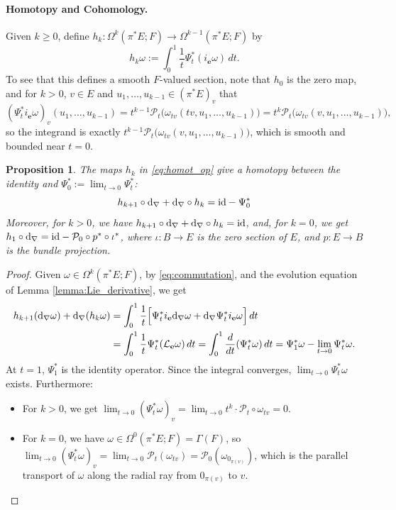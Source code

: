 \documentclass[12pt,letterpaper]{article}
\let\oldd\d
\renewcommand{\d}{%
  \relax\ifmmode\mathrm{d}\else\oldd\fi
}
\newcommand{\e}{\mathbf{e}}
\newcommand{\Lie}{\mathcal{L}}
\newtheorem{proposition}[theorem]{Proposition}
\numberwithin{equation}{section}
\begin{document}
\paragraph{Homotopy and Cohomology.}

Given $k\geq0$, define $h_k:\Omega^k(\pi^*E; F) \to \Omega^{k-1}(\pi^*E; F)$ by 
\begin{equation}\label{eq:homot_op}
h_k \omega := \int_0^1 \frac{1}{t} \Psi_t^* (i_\e \omega) \, dt. 
\end{equation}
To see that this defines a smooth $F$-valued section, note that $h_0$ is the zero map, 
and for $k > 0$, $v \in E$ and $u_1, \dots, u_{k-1} \in (\pi^*E)_v$ that
\[ 
(\Psi_t^* i_\e \omega)_v(u_1, \dots, u_{k-1}) = t^{k-1} \mathcal{P}_t \Big( \omega_{tv}(tv, u_1, \dots, u_{k-1}) \Big) = 
t^k \mathcal{P}_t \Big( \omega_{tv}(v, u_1, \dots, u_{k-1}) \Big),
\]
so the integrand is exactly $t^{k-1} \mathcal{P}_t \Big( \omega_{tv}(v, u_1, \dots, u_{k-1}) \Big)$, 
which is smooth and bounded near $t=0$.

\begin{proposition}\label{prop:homotopy}
The maps $h_k$ in \eqref{eq:homot_op}
give a homotopy between the identity and $\Psi_0^* := \lim_{t \to 0} \Psi_t^*$:
    \[h_{k+1} \circ \d_\nabla  + \d_\nabla \circ h_k = \mathrm{id} - \Psi_0^*\]
Moreover, for $k > 0$, we have $h_{k+1} \circ \d_\nabla  + \d_\nabla \circ h_k = \mathrm{id}$, 
and, for $k=0$, we get $h_1 \circ \d_\nabla = \mathrm{id} - \mathcal{P}_0\circ p^*\circ\iota^*$,
where $\iota: B \to E$ is the zero section of $E$, and $p: E \to B$ is the bundle projection.
\end{proposition}

\begin{proof}
Given $\omega \in \Omega^k(\pi^*E; F)$, by \eqref{eq:commutation}, 
and the evolution equation of Lemma \ref{lemma:Lie_derivative}, we get
    \begin{align*}
        h_{k+1} (\d_\nabla \omega) + \d_\nabla (h_k \omega) 
        &= \int_0^1 \frac{1}{t} \Big[\Psi_t^* i_\e \d_\nabla \omega + \d_\nabla \Psi_t^* i_\e \omega \Big] \, dt \\
        &= \int_0^1 \frac{1}{t} \Psi_t^* (\Lie_\e \omega) \, dt
        = \int_0^1 \frac{d}{dt} (\Psi_t^* \omega) \, dt 
        = \Psi_1^* \omega - \lim_{t \to 0} \Psi_t^* \omega.
    \end{align*}
At $t=1$, $\Psi_1^*$ is the identity operator. Since the integral converges, $\lim_{t \to 0} \Psi_t^* \omega$ exists. Furthermore:
\begin{itemize}
    \item For $k > 0$, we get $\lim_{t\to0}(\Psi_t^* \omega)_v = \lim_{t\to0}t^k \cdot \mathcal{P}_t \circ \omega_{tv} = 0$.
    \item For $k = 0$, we have $\omega \in \Omega^0(\pi^*E; F) = \Gamma(F)$,
          so $\lim_{t\to0}(\Psi_t^* \omega)_v = \lim_{t\to0} \mathcal{P}_t(\omega_{tv}) = \mathcal{P}_0(\omega_{0_{\pi(v)}})$, 
          which is the parallel transport of $\omega$ along the radial ray from $0_{\pi(v)}$ to $v$.
\end{itemize}
\end{proof}
\end{document}
